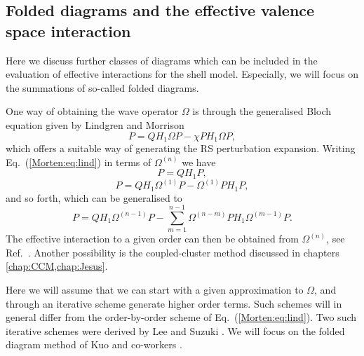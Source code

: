 
\subsection{Folded diagrams and the effective valence space interaction}

Here we discuss further classes of diagrams
which can be included in the evaluation of effective interactions
for the shell model.
Especially, we will focus on the summations of so-called folded
diagrams.

One way of obtaining the wave operator 
$\Omega$ is through the generalised Bloch
equation 
given by Lindgren and Morrison \cite{Morten:lm85}
\begin{equation}
[\Omega, H_0]P=QH_1\Omega P-\chi PH_1\Omega P,
\label{Morten:eq:lind}
\end{equation}
which offers a suitable way of generating the RS perturbation expansion.
Writing Eq.~(\ref{Morten:eq:lind}) in terms of $\Omega^{(n)}$ we have
\begin{equation}
[\Omega^{(1)}, H_0]P=QH_1P,
\end{equation}
\begin{equation}
[\Omega^{(2)}, H_0]P=QH_1\Omega^{(1)} P- \Omega^{(1)} PH_1P,
\end{equation}
and so forth,  which can be generalised to
\begin{equation}
[\Omega^{(n)}, H_0]P=QH_1\Omega^{(n-1)} P- \sum_{m=1}^{n-1}
\Omega^{(n-m)} PH_1\Omega^{(m-1)}P.
\end{equation}
The effective interaction to a given order can then be obtained from
$\Omega^{(n)}$, see Ref.~.
Another possibility is the coupled-cluster method discussed
in chapters \ref{chap:CCM,chap:Jesus}.

Here we will assume that we can start with a given
approximation to $\Omega$, and through an iterative scheme generate
higher order terms. Such schemes will in general differ from the
order-by-order scheme of Eq.~(\ref{Morten:eq:lind}).  Two such iterative
schemes were derived  by Lee and Suzuki \cite{Morten:ls80}. We will focus
on the folded diagram method of Kuo and co-workers \cite{Morten:ko90}.

